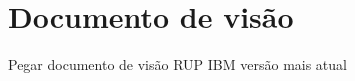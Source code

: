 \chapter[Documento de visão]{Documento de visão}

Pegar documento de visão RUP IBM versão mais atual
